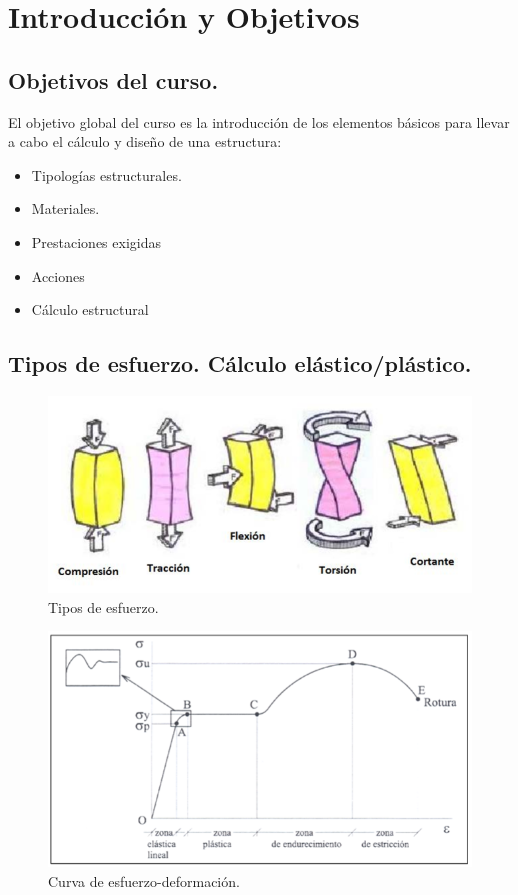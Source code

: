 \chapter{Introducción y Objetivos}
\section{Objetivos del curso.}
El objetivo global del curso es la introducción de los elementos básicos para llevar a cabo el cálculo y diseño de una estructura:
\begin{itemize}
    \item Tipologías estructurales.
    \item Materiales.
    \item Prestaciones exigidas
    \item Acciones
    \item Cálculo estructural
\end{itemize}

\section{Tipos de esfuerzo. Cálculo elástico/plástico.}
\begin{figure}[h]
    \centering
    \includegraphics[width=0.75\linewidth]{Imagenes/Tipos de esfuerzo.png}
    \caption{Tipos de esfuerzo.}
\end{figure}

\begin{figure}[h]
    \centering
    \includegraphics[width=0.75\linewidth]{Imagenes/Diagrama deformacion.png}
    \caption{Curva de esfuerzo-deformación.}
\end{figure}

